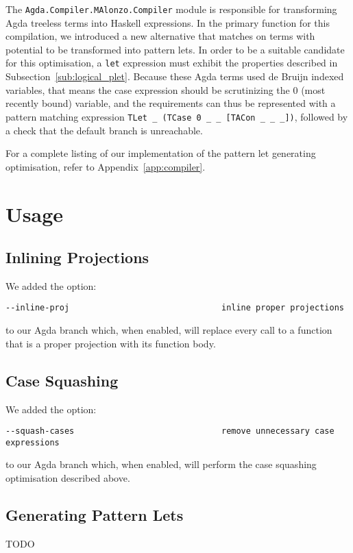 The \lstinline{Agda.Compiler.MAlonzo.Compiler} module is responsible for transforming Agda treeless terms into Haskell expressions. In the primary function for this compilation, we introduced a new alternative that matches on terms with potential to be transformed into pattern lets. In order to be a suitable candidate for this optimisation, a \lstinline{let} expression must exhibit the properties described in Subsection~\ref{sub:logical_plet}. Because these Agda terms used de Bruijn indexed variables, that means the case expression should be scrutinizing the 0 (most recently bound) variable, and the requirements can thus be represented with a pattern matching expression \lstinline{TLet _ (TCase 0 _ _ [TACon _ _ _])}, followed by a check that the default branch is unreachable.

For a complete listing of our implementation of the pattern let generating optimisation, refer to Appendix~\ref{app:compiler}.



\section{Usage}
\label{sec:usage}

\subsection{Inlining Projections}

We added the option:

\begin{verbatim}
--inline-proj                               inline proper projections
\end{verbatim}

to our Agda branch which, when enabled, will replace every call to a function that is a proper projection with its function body.

\subsection{Case Squashing}

We added the option:

\begin{verbatim}
--squash-cases                              remove unnecessary case expressions
\end{verbatim}

to our Agda branch which, when enabled, will perform the case squashing optimisation described above.

\subsection{Generating Pattern Lets}

TODO



